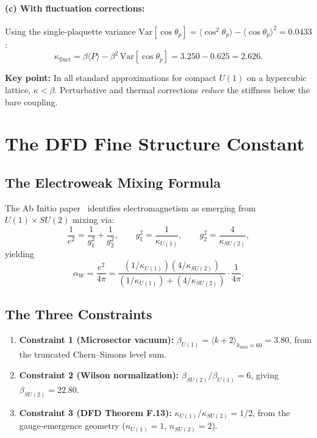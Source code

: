 \documentclass[12pt,a4paper]{article}
\newcommand{\bU}{\beta_{U(1)}}
\newcommand{\bS}{\beta_{SU(2)}}
\newcommand{\kU}{\kappa_{U(1)}}
\newcommand{\kS}{\kappa_{SU(2)}}
\newcommand{\aW}{\alpha_W}
\begin{document}
\paragraph{(c) With fluctuation corrections:}
Using the single-plaquette variance
$\mathrm{Var}[\cos\theta_p] = \langle\cos^2\theta_p\rangle - \langle\cos\theta_p\rangle^2 = 0.0433$:
\begin{equation}
  \kappa_{\text{fluct}} = \beta\langle P\rangle - \beta^2 \,\mathrm{Var}[\cos\theta_p]
  = 3.250 - 0.625 = 2.626.
\end{equation}

\medskip
\noindent\textbf{Key point:} In all standard approximations for compact $U(1)$ on a
hypercubic lattice, $\kappa < \beta$.  Perturbative and thermal corrections
\emph{reduce} the stiffness below the bare coupling.


\section{The DFD Fine Structure Constant}

\subsection{The Electroweak Mixing Formula}

The Ab Initio paper~\cite{Alcock2025} identifies electromagnetism as emerging from
$U(1) \times SU(2)$ mixing via:
\begin{equation}
  \frac{1}{e^2} = \frac{1}{g_1^2} + \frac{1}{g_2^2},
  \qquad
  g_1^2 = \frac{1}{\kU}, \qquad
  g_2^2 = \frac{4}{\kS},
  \label{eq:mixing}
\end{equation}
yielding
\begin{equation}
  \aW = \frac{e^2}{4\pi}
  = \frac{(1/\kU)(4/\kS)}{(1/\kU) + (4/\kS)} \cdot \frac{1}{4\pi}.
  \label{eq:alpha}
\end{equation}

\subsection{The Three Constraints}

\begin{enumerate}
\item \textbf{Constraint 1 (Microsector vacuum):}
  $\bU = \langle k+2 \rangle_{k_{\max}\approx 60} = 3.80$,
  from the truncated Chern--Simons level sum.

\item \textbf{Constraint 2 (Wilson normalization):}
  $\bS/\bU = 6$, giving $\bS = 22.80$.

\item \textbf{Constraint 3 (DFD Theorem F.13):}
  $\kU/\kS = 1/2$, from the gauge-emergence geometry
  ($n_{U(1)} = 1$, $n_{SU(2)} = 2$).
\end{enumerate}
\end{document}
